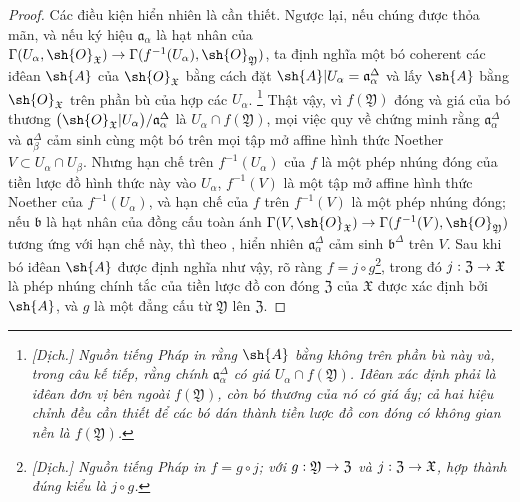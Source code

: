\documentclass[oneside]{amsart}
\makeatletter
\newcommand{\ega@arrow}[2]{\mathchoice{#1}{#2}{#2}{#2}}
\renewcommand{\to}{\ega@arrow{\longrightarrow}{\rightarrow}}
\makeatother
\begin{document}
\begin{proof}
Các điều kiện hiển nhiên là cần thiết.
Ngược lại, nếu chúng được thỏa mãn, và nếu ký hiệu $\mathfrak{a}_\alpha$ là hạt nhân của $\Gamma(U_\alpha,\sh{O}_\mathfrak{X})\to\Gamma(f^{-1}(U_\alpha),\sh{O}_\mathfrak{Y})$, ta định nghĩa một bó coherent các iđêan $\sh{A}$ của $\sh{O}_\mathfrak{X}$ bằng cách đặt $\sh{A}|U_\alpha=\mathfrak{a}_\alpha^\Delta$ và lấy $\sh{A}$ bằng $\sh{O}_\mathfrak{X}$ trên phần bù của hợp các $U_\alpha$.
\footnote{\emph{[Dịch.] Nguồn tiếng Pháp in rằng $\sh{A}$ bằng không trên phần bù này và, trong câu kế tiếp, rằng chính $\mathfrak{a}_\alpha^\Delta$ có giá $U_\alpha\cap f(\mathfrak{Y})$. Iđêan xác định phải là iđêan đơn vị bên ngoài $f(\mathfrak{Y})$, còn bó thương của nó có giá ấy; cả hai hiệu chỉnh đều cần thiết để các bó dán thành tiền lược đồ con đóng có không gian nền là $f(\mathfrak{Y})$.}}
Thật vậy, vì $f(\mathfrak{Y})$ đóng và giá của bó thương $\bigl(\sh{O}_\mathfrak{X}|U_\alpha\bigr)/\mathfrak{a}_\alpha^\Delta$ là $U_\alpha\cap f(\mathfrak{Y})$, mọi việc quy về chứng minh rằng $\mathfrak{a}_\alpha^\Delta$ và $\mathfrak{a}_\beta^\Delta$ cảm sinh cùng một bó trên mọi tập mở affine hình thức Noether $V\subset U_\alpha\cap U_\beta$.
Nhưng hạn chế trên $f^{-1}(U_\alpha)$ của $f$ là một phép nhúng đóng của tiền lược đồ hình thức này vào $U_\alpha$, $f^{-1}(V)$ là một tập mở affine hình thức Noether của $f^{-1}(U_\alpha)$, và hạn chế của $f$ trên $f^{-1}(V)$ là một phép nhúng đóng;
nếu $\mathfrak{b}$ là hạt nhân của đồng cấu toàn ánh $\Gamma(V,\sh{O}_\mathfrak{X})\to\Gamma(f^{-1}(V),\sh{O}_\mathfrak{Y})$ tương ứng với hạn chế này, thì theo , hiển nhiên $\mathfrak{a}_\alpha^\Delta$ cảm sinh $\mathfrak{b}^\Delta$ trên $V$.
Sau khi bó iđêan $\sh{A}$ được định nghĩa như vậy, rõ ràng $f=j\circ g$\footnote{\emph{[Dịch.] Nguồn tiếng Pháp in $f=g\circ j$; với $g:\mathfrak{Y}\to\mathfrak{Z}$ và $j:\mathfrak{Z}\to\mathfrak{X}$, hợp thành đúng kiểu là $j\circ g$.}}, trong đó $j:\mathfrak{Z}\to\mathfrak{X}$ là phép nhúng chính tắc của tiền lược đồ con đóng $\mathfrak{Z}$ của $\mathfrak{X}$ được xác định bởi $\sh{A}$, và $g$ là một đẳng cấu từ $\mathfrak{Y}$ lên $\mathfrak{Z}$.
\end{proof}
\end{document}

